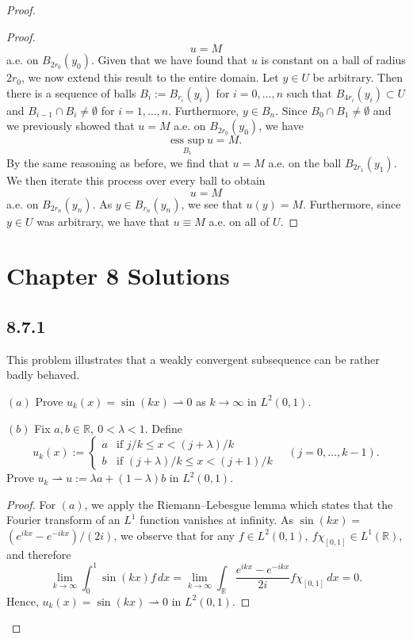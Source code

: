 \documentclass{article}
\begin{document}
\begin{flushleft}
\begin{proof}
\begin{proof}
\begin{equation}
    u=M
\end{equation}
a.e. on $B_{2{r_0}}(y_0)$. Given that we have found that $u$ is constant on a ball of radius $2{r_0}$, we now extend this result to the entire domain. Let $y\in U$ be arbitrary. Then there is a sequence of balls $B_i:= B_{r_i}(y_i)$ for $i=0,\ldots,n$ such that $B_{4r_i}(y_i)\subset U$ and $B_{i-1}\cap B_i\neq \emptyset$ for $i=1,\ldots,n.$ Furthermore, $y\in B_n$. Since $B_0\cap B_1 \neq \emptyset$ and we previously showed that $u=M$ a.e. on $B_{2{r_0}}(y_0)$, we have
$$\underset{B_1}{\text{ess sup}}~u=M.$$
By the same reasoning as before, we find that $u=M$ a.e. on the ball $B_{2r_1}(y_1)$. We then iterate this process over every ball to obtain
$$u=M$$
a.e. on $B_{2r_n}(y_n)$. As $y\in B_{r_n}(y_n)$, we see that $u(y)=M$. Furthermore, since $y\in U$ was arbitrary, we have that $u\equiv M$ a.e. on all of $U$.

\end{proof}
\section{Chapter 8 Solutions}
\subsection{\textbf{8.7.1}} This problem illustrates that a weakly convergent subsequence can be rather badly behaved.

$(a)$ Prove $u_k(x)=\sin(kx) \rightharpoonup 0$ as $k\to\infty$ in $L^2(0,1)$.

$(b)$ Fix $a,b\in\mathbb R, ~0 < \lambda < 1$. Define
$$u_k(x):=
  \begin{cases} 
      a & \text{if $j/k \le x < (j+\lambda)/k$} \\
      b & \text{if $(j+\lambda)/k \le x < (j+1)/k$}
   \end{cases} \quad (j=0,\ldots,k-1).
$$
Prove $u_k \rightharpoonup u:=\lambda a + (1-\lambda)b$ in $L^2(0,1)$.
\begin{proof}
For $(a)$, we apply the Riemann–Lebesgue lemma which states that the Fourier transform of an $L^1$ function vanishes at infinity. As $\sin(kx)= $ $(e^{ikx}-e^{-ikx})/(2i)$, we observe that for any $f\in L^2(0,1), ~f\chi_{[0,1]} \in L^1(\mathbb R)$, and therefore
$$\lim_{k\to\infty}\int_0^1 \sin(kx) f\,dx = \lim_{k\to\infty}\int_{\mathbb R}\frac{e^{ikx}-e^{-ikx}}{2i}f\chi_{[0,1]}\,dx=0.$$
Hence, $u_k(x)=\sin(kx) \rightharpoonup 0$ in $L^2(0,1)$.


\end{proof}
\end{proof}
\end{flushleft}
\end{document}
